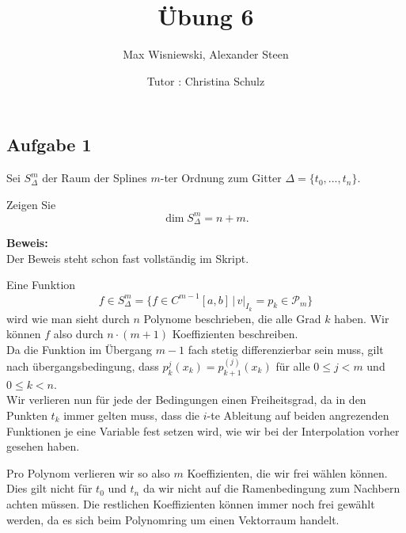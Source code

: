 \documentclass[11pt,a4paper,ngerman]{article}
\date{Tutor : Christina Schulz}
\title{Übung 6}
\author{Max Wisniewski, Alexander Steen}
\begin{document}

\renewcommand{\figurename}{Figure}

\maketitle
\thispagestyle{fancy}

\subsection*{Aufgabe 1}

Sei $S_\Delta^m$ der Raum der Splines $m$-ter Ordnung zum Gitter $\Delta = \{ t_0 , ..., t_n \}$.

Zeigen Sie
\begin{equation*}
    \dim S_\Delta^m = n + m.
\end{equation*}

\textbf{Beweis:}\\

Der Beweis steht schon fast vollständig im Skript.

Eine Funktion
\begin{equation*}
    f \in S_\Delta^m = \{ f \in C^{m-1}[a,b] \, | \, v|_{I_k} = p_k \in \mathcal{P}_m\}
\end{equation*}
wird wie man sieht durch $n$ Polynome beschrieben, die alle Grad $k$ haben.
Wir können $f$ also durch $n \cdot (m+1)$ Koeffizienten beschreiben.\\

Da die Funktion im Übergang $m-1$ fach stetig differenzierbar sein muss, gilt nach übergangsbedingung,
dass $p_k^j(x_k) = p_{k+1}^(j)(x_k)$ für alle $0 \leq j < m$ und $0 \leq k < n$.\\

Wir verlieren nun für jede der Bedingungen einen Freiheitsgrad, da in den Punkten $t_k$ immer
gelten muss, dass die $i$-te Ableitung auf beiden angrezenden Funktionen je eine Variable fest setzen
wird, wie wir bei der Interpolation vorher gesehen haben.

Pro Polynom verlieren wir so also $m$ Koeffizienten, die wir frei wählen können. Dies gilt nicht für
$t_0$ und $t_n$ da wir nicht auf die Ramenbedingung zum Nachbern achten müssen. Die restlichen
Koeffizienten können immer noch frei gewählt werden, da es sich beim Polynomring um einen Vektorraum handelt.
\end{document}

